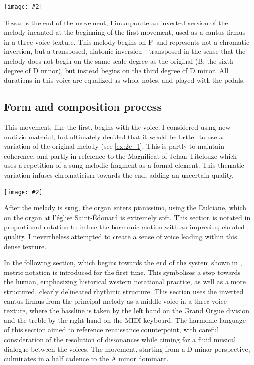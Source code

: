 \documentclass[12pt,twoside,maitrise]{dms_ks}
\newcommand{\customincludeexamples}[4][]{%
    \begin{example}[H]
        \centering
        \texttt{[image: \#2]}
        \caption{#4}
	\label{#3} 
    \end{example}
}
\theoremstyle{definition}
\begin{document}
{\customincludeexamples[]{g7alt}{fig:g7alt}{A classic G7alt chord on the left, and my variation with a \sh7 on the right.}

Towards the end of the movement, I incorporate an inverted version of the melody incanted at the beginning of the first movement, used as a cantus firmus in a three voice texture.
This melody begins on F\na\ and represents not a chromatic inversion, but a transposed, diatonic inversion---transposed in the sense that the melody does not begin on the same scale degree as the original (B\fl, the sixth degree of D minor), but instead begins on the third degree of D minor. 
All durations in this voice are equalized as whole notes, and played with the pedals.

\subsection{Form and composition process}

This movement, like the first, begins with the voice.
I considered using new motivic material, but ultimately decided that it would be better to use a variation of the original melody (see \cref{ex:2e_1}.
This is partly to maintain coherence, and partly in reference to the Magnificat of Jehan Titelouze which uses a repetition of a sung melodic fragment as a formal element.
This thematic variation infuses chromaticism towards the end, adding an uncertain quality.

\customincludeexamples[width=\textwidth]{2e_1}{ex:2e_1}{A variation of the sung melody from the first movement (p.~2, sys.~1).}

After the melody is sung, the organ enters pianissimo, using the Dulciane, which on the organ at l'église Saint-Édouard is extremely soft.
This section is notated in proportional notation to imbue the harmonic motion with an imprecise, clouded quality.
I nevertheless attempted to create a sense of voice leading within this dense texture.

In the following section, which begins towards the end of the system shown in , metric notation is introduced for the first time.
This symbolises a step towards the human, emphasizing historical western notational practice, as well as a more structured, clearly delineated rhythmic structure. 
This section uses the inverted cantus firmus from the principal melody as a middle voice in a three voice texture, where the bassline is taken by the left hand on the Grand Orgue division and the treble by the right hand on the MIDI keyboard.
The harmonic language of this section aimed to reference renaissance counterpoint, with careful consideration of the resolution of dissonances while aiming for a fluid musical dialogue between the voices.
The movement, starting from a D minor perspective, culminates in a half cadence to the A minor dominant.

}
\end{document}
